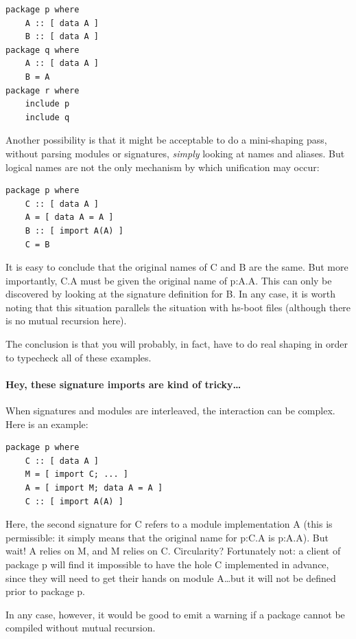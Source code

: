 \documentclass{article}
\begin{document}
\begin{verbatim}
package p where
    A :: [ data A ]
    B :: [ data A ]
package q where
    A :: [ data A ]
    B = A
package r where
    include p
    include q
\end{verbatim}

Another possibility is that it might be acceptable to do a mini-shaping
pass, without parsing modules or signatures, \emph{simply} looking at
names and aliases.  But logical names are not the only mechanism by
which unification may occur:

\begin{verbatim}
package p where
    C :: [ data A ]
    A = [ data A = A ]
    B :: [ import A(A) ]
    C = B
\end{verbatim}

It is easy to conclude that the original names of C and B are the same.  But
more importantly, C.A must be given the original name of p:A.A.  This can only
be discovered by looking at the signature definition for B. In any case, it
is worth noting that this situation parallels the situation with hs-boot
files (although there is no mutual recursion here).

The conclusion is that you will probably, in fact, have to do real
shaping in order to typecheck all of these examples.

\paragraph{Hey, these signature imports are kind of tricky\ldots}

When signatures and modules are interleaved, the interaction can be
complex.  Here is an example:

\begin{verbatim}
package p where
    C :: [ data A ]
    M = [ import C; ... ]
    A = [ import M; data A = A ]
    C :: [ import A(A) ]
\end{verbatim}

Here, the second signature for C refers to a module implementation A
(this is permissible: it simply means that the original name for p:C.A
is p:A.A).  But wait! A relies on M, and M relies on C. Circularity?
Fortunately not: a client of package p will find it impossible to have
the hole C implemented in advance, since they will need to get their hands on module
A\ldots but it will not be defined prior to package p.

In any case, however, it would be good to emit a warning if a package
cannot be compiled without mutual recursion.
\end{document}
